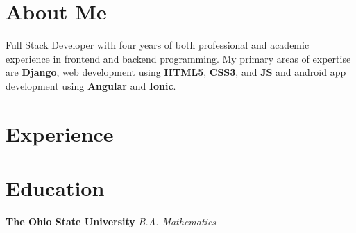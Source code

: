 \documentclass{article}
\begin{document}
\section{About Me}
Full Stack Developer with four years of both
professional and academic experience in frontend
and backend programming. My primary areas of
expertise are \textbf{Django}, web development using \textbf{HTML5},
\textbf{CSS3}, and \textbf{JS} and android app development using
\textbf{Angular} and \textbf{Ionic}.

\section{Experience}

\section{Education}
\textbf{The Ohio State University}
\newline
\textit{B.A. Mathematics}
\end{document}
